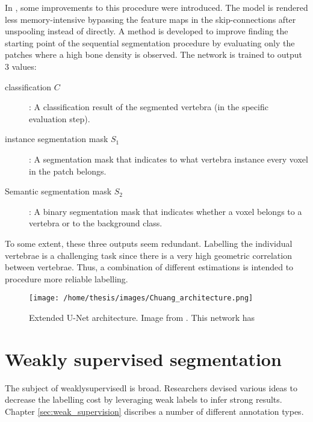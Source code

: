 \par{
    In \cite{Chuang2019}, some improvements to this procedure were introduced.
    The model is rendered less memory-intensive bypassing the feature maps in the skip-connections after unspooling instead of directly.
    A method is developed to improve finding the starting point of the sequential segmentation procedure by evaluating only the patches where a high bone density is observed.
    The network is trained to output 3 values:
    \begin{description}
        \item[classification $C$]: A classification result of the segmented vertebra (in the specific evaluation step).
        \item[instance segmentation mask $S_1$]: A segmentation mask that indicates to what vertebra instance every voxel in the patch belongs. 
        \item[Semantic segmentation mask $S_2$]: A binary segmentation mask that indicates whether a voxel belongs to a vertebra or to the background class.
    \end{description}
    To some extent, these three outputs seem redundant. 
    Labelling the individual vertebrae is a challenging task since there is a very high geometric correlation between vertebrae.
    Thus, a combination of different estimations is intended to procedure more reliable labelling.
}
\begin{SCfigure}[][htb]
    \texttt{[image: /home/thesis/images/Chuang\_architecture.png]}
    \caption{Extended U-Net architecture. Image from \cite{Chuang2019}.
    This network has }
    \label{fig:chuang_architecture}
\end{SCfigure}



\section{Weakly supervised segmentation\label{sec:PreviousWork_weaklySupervised}}
\par{
    The subject of \Gls{weaklysupervisedl} is broad.
    Researchers devised various ideas to decrease the labelling cost by leveraging weak labels to infer strong results.
    Chapter \ref{sec:weak_supervision} discribes a number of different annotation types.
}
